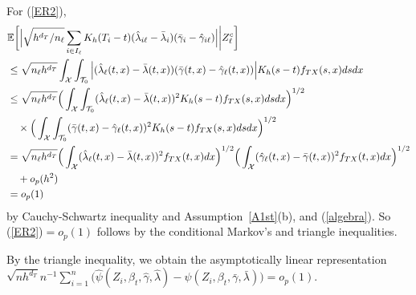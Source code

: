 \documentclass[lettersize, 12pt]{article}
\begin{document}

For (\ref{ER2}),
\begin{align}
&\mathbb{E}\bigg[ \Big| \sqrt{h^{d_T}/n_\ell} \sum_{i \in I_\ell} K_h(T_i - t)(\hat \lambda_{i\ell} - \bar \lambda_i)(\bar \gamma_i - \hat \gamma_{i\ell})  \Big|  \bigg|Z_\ell^c\bigg] \notag\\
&\leq
\sqrt{n_\ell h^{d_T}} \int_\mathcal{X} \int_{\mathcal{T}_0} \Big| (\hat \lambda_{\ell}(t,x) - \bar \lambda(t,x))(\bar \gamma(t,x) - \hat \gamma_{\ell}(t,x)) \Big| K_h(s - t) f_{TX}(s,x)ds dx \notag\\
&\leq
\sqrt{n_\ell h^{d_T}} 
\Big(
\int_\mathcal{X} \int_{\mathcal{T}_0} (\hat \lambda_{\ell}(t,x) - \bar \lambda(t,x))^2 K_h(s - t) f_{TX}(s,x)ds dx \Big)^{1/2}
\notag \\
&\ \ \ \times \Big(
\int_\mathcal{X} \int_{\mathcal{T}_0} (\bar \gamma(t,x) - \hat \gamma_{\ell}(t,x))^2 K_h(s - t) f_{TX}(s,x)ds dx \Big)^{1/2}
\notag\\
&= \sqrt{n_\ell h^{d_T}}
\Big(\int_\mathcal{X} (\hat\lambda_{\ell}(t,x) - \bar \lambda(t,x))^2f_{TX}(t, x) dx \Big)^{1/2}
\Big(\int_\mathcal{X} (\hat\gamma_{\ell}(t,x) - \bar \gamma(t,x))^2f_{TX}(t, x) dx \Big)^{1/2} 
\notag\\
&\ \ \ + o_p(h^2) \notag
\\
&= o_p(1) 
\label{ER2pf}
\end{align}
by Cauchy-Schwartz inequality and Assumption~\ref{A1st}(b), and (\ref{algebra}).
So (\ref{ER2})$=o_p(1)$ follows by the conditional Markov's and triangle inequalities.


By the triangle inequality, we obtain the asymptotically linear representation\\ 
$\sqrt{nh^{d_T}} n^{-1}\sum_{i=1}^n \big( \hat \psi(Z_i, \beta_t, \hat \gamma, \hat \lambda) - \psi(Z_i, \beta_t, \bar\gamma, \bar\lambda) \big) = o_p(1)$.


\end{document}
